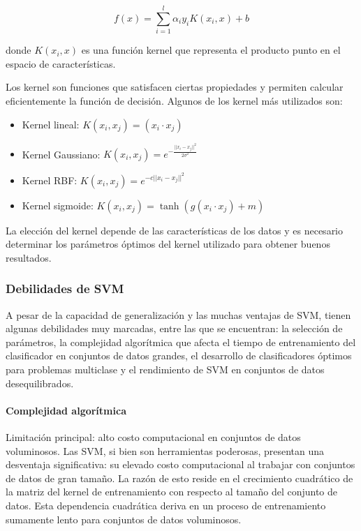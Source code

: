 \[
f(x) = \sum_{i=1}^{l} \alpha_i y_i K(x_i, x) + b
\]

donde $K(x_i, x)$ es una función kernel que representa el producto punto en el espacio de características.

Los kernel son funciones que satisfacen ciertas propiedades y permiten calcular eficientemente la función de decisión. Algunos de los kernel más utilizados son:

\begin{itemize}
	\item Kernel lineal: $K(x_i, x_j) = (x_i \cdot x_j)$
	\item Kernel Gaussiano: $K(x_i, x_j) = e^{-\frac{||x_i - x_j||^2}{2\sigma^2}}$
	\item Kernel RBF: $K(x_i, x_j) = e^{-c||x_i - x_j||^2}$
	\item Kernel sigmoide: $K(x_i, x_j) = \tanh(g(x_i \cdot x_j) + m)$
\end{itemize}

La elección del kernel depende de las características de los datos y es necesario determinar los parámetros óptimos del kernel utilizado para obtener buenos resultados.

\subsubsection{Debilidades de SVM}
A pesar de la capacidad de generalización y las muchas ventajas de SVM, tienen algunas debilidades muy marcadas, entre las que se encuentran: la selección de parámetros, la complejidad algorítmica que afecta el tiempo de entrenamiento del clasificador en conjuntos de datos grandes, el desarrollo de clasificadores óptimos para problemas multiclase y el rendimiento de SVM en conjuntos de datos desequilibrados.

\paragraph{Complejidad algorítmica}

Limitación principal: alto costo computacional en conjuntos de datos voluminosos. Las SVM, si bien son herramientas poderosas, presentan una desventaja significativa: su elevado costo computacional al trabajar con conjuntos de datos de gran tamaño. La razón de esto reside en el crecimiento cuadrático de la matriz del kernel de entrenamiento con respecto al tamaño del conjunto de datos. Esta dependencia cuadrática deriva en un proceso de entrenamiento sumamente lento para conjuntos de datos voluminosos.

